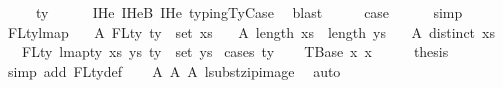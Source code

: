 \begin{isabellebody}
\ \ \ \ {\isacharcolon}{\kern0pt}\ ty{}{\isacharprime}{\kern0pt}{\isachardoublequoteclose}\isanewline
\ \ \ \ \isamarkupfalse%
\ IHe{}\ IHe{}B\ IHe{}\ typing{\isachardot}{\kern0pt}TyCase\ \isamarkupfalse%
\ blast\isanewline
\ \ \isamarkupfalse%
\ \isamarkupfalse%
\ {\isacharquery}{\kern0pt}case\isanewline
\ \ \ \ \isamarkupfalse%
\ simp\isanewline
{}\isamarkupfalse%
%
\endisatagproof
{\isafoldproof}%
%
\isadelimproof
%
\endisadelimproof
%
\isadelimdocument
%
\endisadelimdocument
%
\isatagdocument
%
\isamarkuptrue%
%
\endisatagdocument
{\isafolddocument}%
%
\isadelimdocument
%
\endisadelimdocument
{}\isamarkupfalse%
\ FL{\isacharunderscore}{\kern0pt}ty{\isacharunderscore}{\kern0pt}lmap{\isacharcolon}{\kern0pt}\isanewline
\ \ \ A{}{\isacharcolon}{\kern0pt}\ {\isachardoublequoteopen}FLty\ ty\ {\isacharequal}{\kern0pt}\ set\ xs{\isachardoublequoteclose}\isanewline
\ \ \ A{}{\isacharcolon}{\kern0pt}\ {\isachardoublequoteopen}length\ xs\ {\isacharequal}{\kern0pt}\ length\ ys{\isachardoublequoteclose}\isanewline
\ \ \ A{}{\isacharcolon}{\kern0pt}\ {\isachardoublequoteopen}distinct\ xs{\isachardoublequoteclose}\isanewline
\ \ \ {\isachardoublequoteopen}FLty\ {\isacharparenleft}{\kern0pt}lmap{\isacharunderscore}{\kern0pt}ty\ xs\ ys\ ty{\isacharparenright}{\kern0pt}\ {\isacharequal}{\kern0pt}\ set\ ys{\isachardoublequoteclose}\isanewline
%
\isadelimproof
%
\endisadelimproof
%
\isatagproof
{}\isamarkupfalse%
\ {\isacharparenleft}{\kern0pt}cases\ ty{\isacharparenright}{\kern0pt}\isanewline
\ \ \isamarkupfalse%
\ {\isacharparenleft}{\kern0pt}TBase\ x{}{}\ x{}{}{\isacharparenright}{\kern0pt}\isanewline
\ \ \isamarkupfalse%
\ \isamarkupfalse%
\ {\isacharquery}{\kern0pt}thesis\isanewline
\ \ \isamarkupfalse%
\ {\isacharparenleft}{\kern0pt}simp\ add{\isacharcolon}{\kern0pt}\ FLty{\isacharunderscore}{\kern0pt}def{\isacharparenright}{\kern0pt}\isanewline
\ \ \isamarkupfalse%
\ A{}\ A{}\ A{}\ lsubst{\isacharunderscore}{\kern0pt}zip{\isacharunderscore}{\kern0pt}image\ \isamarkupfalse%
\ auto\isanewline
{}\isamarkupfalse%

\end{isabellebody}
